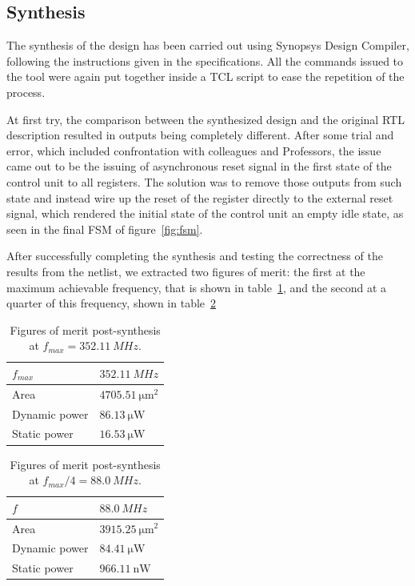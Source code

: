 \documentclass[a4paper]{article}
\begin{document}
\subsection{Synthesis}
The synthesis of the design has been carried out using Synopsys Design Compiler, following the instructions given in the specifications. All the commands issued to the tool were again put together inside a TCL script to ease the repetition of the process. 

At first try, the comparison between the synthesized design and the original RTL description resulted in outputs being completely different. After some trial and error, which included confrontation with colleagues and Professors, the issue came out to be the issuing of asynchronous reset signal in the first state of the control unit to all registers. The solution was to remove those outputs from such state and instead wire up the reset of the register directly to the external reset signal, which rendered the initial state of the control unit an empty idle state, as seen in the final FSM of figure~\ref{fig:fsm}.

After successfully completing the synthesis and testing the correctness of the results from the netlist, we extracted two figures of merit: the first at the maximum achievable frequency, that is shown in table~\ref{tab:base_post_syn_maxf}, and the second at a quarter of this frequency, shown in table~\ref{tab:base_post_syn}

\begin{table}[hbtp]
    \centering
    \begin{tabular}{|l|l|}
    \hline
    $f_{max}$     & $\SI{352.11}{MHz}$              \\ \hline
    Area          & $\SI{4705.51}{\micro\meter^2}$  \\ \hline
    Dynamic power & $\SI{86.13}{\micro\watt}$       \\ \hline
    Static power  & $\SI{16.53}{\micro\watt}$       \\ \hline
    \end{tabular}
    \caption{Figures of merit post-synthesis at $f_{max} = \SI{352.11}{MHz}$.}
    \label{tab:base_post_syn_maxf}
\end{table}

\begin{table}[hbtp]
    \centering
    \begin{tabular}{|l|l|}
    \hline
    $f$           & $\SI{88.0}{MHz}$                \\ \hline
    Area          & $\SI{3915.25}{\micro\meter^2}$  \\ \hline 
    Dynamic power & $\SI{84.41}{\micro\watt}$       \\ \hline
    Static power  & $\SI{966.11}{\nano\watt}$       \\ \hline
    \end{tabular}
    \caption{Figures of merit post-synthesis at $f_{max}/4 = \SI{88.0}{MHz}$.}
    \label{tab:base_post_syn}
\end{table}
\end{document}
